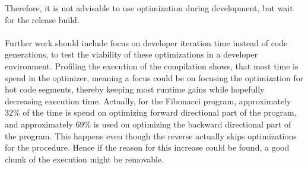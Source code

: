 Therefore, it is not advisable to use optimization during development, but wait for the
release build.
\\
\\
Further work should include focus on developer iteration time instead of code generations,
to test the viability of these optimizations in a developer environment. Profiling the execution
of the compilation shows, that most time is spend in the optimizer, meaning a focus could be
on focusing the optimization for hot code segments, thereby keeping most runtime gains while
hopefully decreasing execution time. Actually, for the Fibonacci program, approximately
$32\%$ of the time is spend on optimizing forward directional part of the program, and
approximately $69\%$ is used on optimizing the backward directional part of the program.
This happens even though the reverse actually skips optimizations for the 
procedure. Hence if the reason for this increase could be found, a good chunk of the
execution might be removable.

